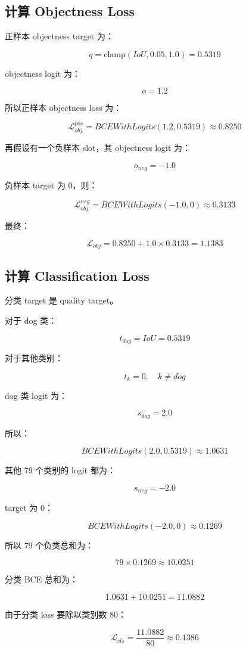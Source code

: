 \documentclass[UTF8,12pt]{ctexart}
\begin{document}
\subsection{计算 Objectness Loss}

正样本 objectness target 为：

\[
q=\text{clamp}(IoU,0.05,1.0)=0.5319
\]

objectness logit 为：

\[
o=1.2
\]

所以正样本 objectness loss 为：

\[
\mathcal{L}_{obj}^{pos}
=BCEWithLogits(1.2,0.5319)
\approx 0.8250
\]

再假设有一个负样本 slot，其 objectness logit 为：

\[
o_{neg}=-1.0
\]

负样本 target 为 0，则：

\[
\mathcal{L}_{obj}^{neg}
=BCEWithLogits(-1.0,0)
\approx 0.3133
\]

最终：

\[
\mathcal{L}_{obj}
=0.8250+1.0 \times 0.3133
=1.1383
\]

\subsection{计算 Classification Loss}

分类 target 是 quality target。

对于 dog 类：

\[
t_{dog}=IoU=0.5319
\]

对于其他类别：

\[
t_k=0,\quad k \neq dog
\]

dog 类 logit 为：

\[
s_{dog}=2.0
\]

所以：

\[
BCEWithLogits(2.0,0.5319)\approx 1.0631
\]

其他 79 个类别的 logit 都为：

\[
s_{neg}=-2.0
\]

target 为 0：

\[
BCEWithLogits(-2.0,0)\approx 0.1269
\]

所以 79 个负类总和为：

\[
79 \times 0.1269 \approx 10.0251
\]

分类 BCE 总和为：

\[
1.0631+10.0251=11.0882
\]

由于分类 loss 要除以类别数 80：

\[
\mathcal{L}_{cls}
=\frac{11.0882}{80}
\approx 0.1386
\]
\end{document}
